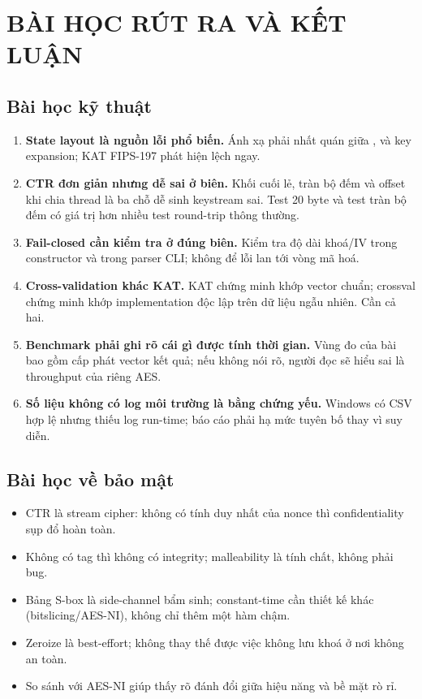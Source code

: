 \documentclass[12pt,a4paper,oneside]{report}
\let\origtexttt\texttt
\renewcommand{\texttt}[1]{\origtexttt{\seqsplit{#1}}}
\begin{document}
\chapter{BÀI HỌC RÚT RA VÀ KẾT LUẬN}


\section{Bài học kỹ thuật}


\begin{enumerate}[leftmargin=*]
\item \textbf{State layout là nguồn lỗi phổ biến.} Ánh xạ \texttt{state[col][row]} phải nhất quán giữa \texttt{SubBytes}, \texttt{ShiftRows} và key expansion; KAT FIPS-197 phát hiện lệch ngay.
\item \textbf{CTR đơn giản nhưng dễ sai ở biên.} Khối cuối lẻ, tràn bộ đếm và offset khi chia thread là ba chỗ dễ sinh keystream sai. Test 20 byte và test tràn bộ đếm có giá trị hơn nhiều test round-trip thông thường.
\item \textbf{Fail-closed cần kiểm tra ở đúng biên.} Kiểm tra độ dài khoá/IV trong constructor và trong parser CLI; không để lỗi lan tới vòng mã hoá.
\item \textbf{Cross-validation khác KAT.} KAT chứng minh khớp vector chuẩn; crossval chứng minh khớp implementation độc lập trên dữ liệu ngẫu nhiên. Cần cả hai.
\item \textbf{Benchmark phải ghi rõ cái gì được tính thời gian.} Vùng đo của bài bao gồm cấp phát vector kết quả; nếu không nói rõ, người đọc sẽ hiểu sai là throughput của riêng AES.
\item \textbf{Số liệu không có log môi trường là bằng chứng yếu.} Windows có CSV hợp lệ nhưng thiếu log run-time; báo cáo phải hạ mức tuyên bố thay vì suy diễn.
\end{enumerate}


\section{Bài học về bảo mật}


\begin{itemize}[leftmargin=*]
\item CTR là stream cipher: không có tính duy nhất của nonce thì confidentiality sụp đổ hoàn toàn.
\item Không có tag thì không có integrity; malleability là tính chất, không phải bug.
\item Bảng S-box là side-channel bẩm sinh; constant-time cần thiết kế khác (bitslicing/AES-NI), không chỉ thêm một hàm chậm.
\item Zeroize là best-effort; không thay thế được việc không lưu khoá ở nơi không an toàn.
\item So sánh với AES-NI giúp thấy rõ đánh đổi giữa hiệu năng và bề mặt rò rỉ.
\end{itemize}
\end{document}
